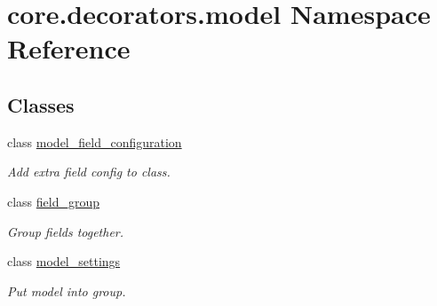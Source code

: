\hypertarget{namespacecore_1_1decorators_1_1model}{\section{core.\-decorators.\-model Namespace Reference}
\label{namespacecore_1_1decorators_1_1model}
}
\subsection*{Classes}
\begin{DoxyCompactItemize}
\item 
class \hyperlink{classcore_1_1decorators_1_1model_1_1model__field__configuration}{model\-\_\-field\-\_\-configuration}
\begin{DoxyCompactList}\small\item\em Add extra field config to class. \end{DoxyCompactList}\item 
class \hyperlink{classcore_1_1decorators_1_1model_1_1field__group}{field\-\_\-group}
\begin{DoxyCompactList}\small\item\em Group fields together. \end{DoxyCompactList}\item 
class \hyperlink{classcore_1_1decorators_1_1model_1_1model__settings}{model\-\_\-settings}
\begin{DoxyCompactList}\small\item\em Put model into group. \end{DoxyCompactList}\end{DoxyCompactItemize}
